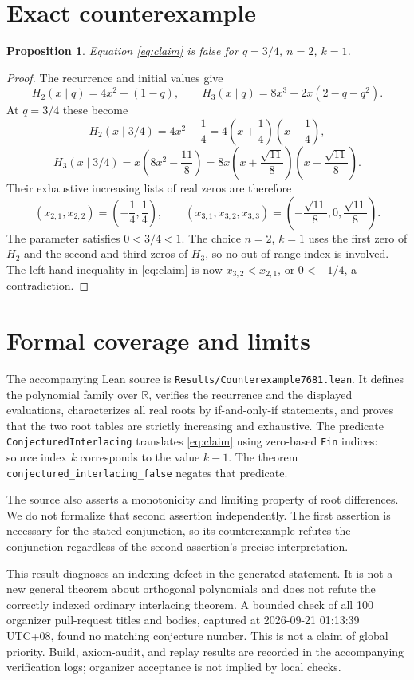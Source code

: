 \documentclass[11pt]{article}
\newtheorem{proposition}{Proposition}
\begin{document}
\section{Exact counterexample}
\begin{proposition}
Equation \eqref{eq:claim} is false for $q=3/4$, $n=2$, $k=1$.
\end{proposition}
\begin{proof}
The recurrence and initial values give
\[
 H_2(x\mid q)=4x^2-(1-q),\qquad
 H_3(x\mid q)=8x^3-2x(2-q-q^2).
\]
At $q=3/4$ these become
\[
 H_2(x\mid 3/4)=4x^2-\frac14
    =4\left(x+\frac14\right)\left(x-\frac14\right),
\]
\[
 H_3(x\mid 3/4)=x\left(8x^2-\frac{11}{8}\right)
    =8x\left(x+\frac{\sqrt{11}}8\right)
          \left(x-\frac{\sqrt{11}}8\right).
\]
Their exhaustive increasing lists of real zeros are therefore
\[
 (x_{2,1},x_{2,2})=\left(-\frac14,\frac14\right),
\qquad
 (x_{3,1},x_{3,2},x_{3,3})=
   \left(-\frac{\sqrt{11}}8,0,\frac{\sqrt{11}}8\right).
\]
The parameter satisfies $0<3/4<1$. The choice $n=2$, $k=1$ uses the
first zero of $H_2$ and the second and third zeros of $H_3$, so no
out-of-range index is involved. The left-hand inequality in
\eqref{eq:claim} is now $x_{3,2}<x_{2,1}$, or $0<-1/4$, a contradiction.
\end{proof}

\section{Formal coverage and limits}
\begingroup\raggedright
The accompanying Lean source is
\texttt{Results/Counterexample7681.lean}. It defines the polynomial family
over $\mathbb R$, verifies the recurrence and the displayed evaluations,
characterizes all real roots by if-and-only-if statements, and proves that
the two root tables are strictly increasing and exhaustive. The predicate
\texttt{ConjecturedInterlacing} translates \eqref{eq:claim} using zero-based
\texttt{Fin} indices: source index $k$ corresponds to the value $k-1$.
The theorem \texttt{conjectured\_interlacing\_false} negates that predicate.
\par\endgroup

The source also asserts a monotonicity and limiting property of root
differences. We do not formalize that second assertion independently.
The first assertion is necessary for the stated conjunction, so its
counterexample refutes the conjunction regardless of the second
assertion's precise interpretation.

This result diagnoses an indexing defect in the generated statement. It
is not a new general theorem about orthogonal polynomials and does not
refute the correctly indexed ordinary interlacing theorem. A bounded
check of all 100 organizer pull-request titles and bodies, captured at
2026-09-21 01:13:39 UTC+08, found no matching conjecture number. This is
not a claim of global priority. Build, axiom-audit, and replay results are
recorded in the accompanying verification logs; organizer acceptance is
not implied by local checks.
\end{document}
